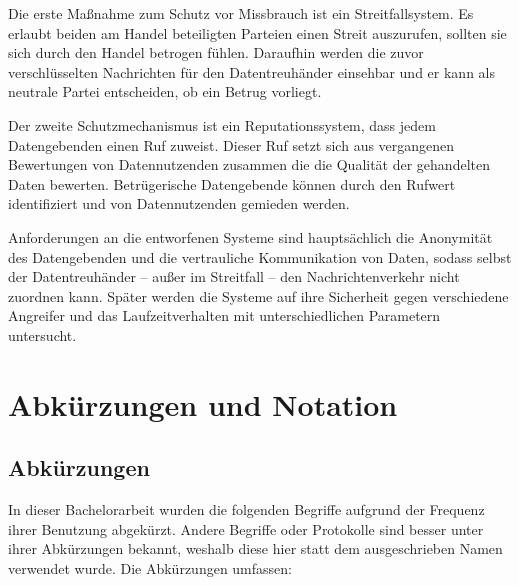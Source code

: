 \documentclass[
	fontsize=11pt,
	headings=small,
	parskip=half,           %
	bibliography=totoc,
	numbers=noenddot,       %
	open=any,               %
]{scrreprt}
\begin{document}
Die erste Maßnahme zum Schutz vor Missbrauch ist ein Streitfallsystem. Es erlaubt beiden am Handel beteiligten Parteien einen Streit auszurufen, sollten sie sich durch den Handel betrogen fühlen. Daraufhin werden die zuvor verschlüsselten Nachrichten für den Datentreuhänder einsehbar und er kann als neutrale Partei entscheiden, ob ein Betrug vorliegt.

Der zweite Schutzmechanismus ist ein Reputationssystem, dass jedem Datengebenden einen Ruf zuweist. Dieser Ruf setzt sich aus vergangenen Bewertungen von Datennutzenden zusammen die die Qualität der gehandelten Daten bewerten. Betrügerische Datengebende können durch den Rufwert identifiziert und von Datennutzenden gemieden werden. 

Anforderungen an die entworfenen Systeme sind hauptsächlich die Anonymität des Datengebenden und die vertrauliche Kommunikation von Daten, sodass selbst der Datentreuhänder -- außer im Streitfall -- den Nachrichtenverkehr nicht zuordnen kann. Später werden die Systeme auf ihre Sicherheit gegen verschiedene Angreifer und das Laufzeitverhalten mit unterschiedlichen Parametern untersucht.

\restoregeometry
\chapter*{Abkürzungen und Notation}
\section*{Abkürzungen}
In dieser Bachelorarbeit wurden die folgenden Begriffe aufgrund der Frequenz ihrer Benutzung abgekürzt. Andere Begriffe oder Protokolle sind besser unter ihrer Abkürzungen bekannt, weshalb diese hier statt dem ausgeschrieben Namen verwendet wurde. Die Abkürzungen umfassen:
\end{document}
